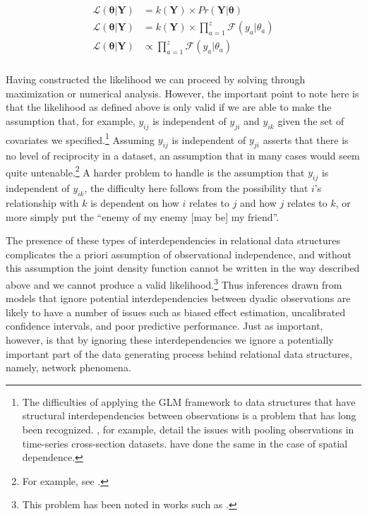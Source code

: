 \begin{align}
\begin{aligned}
	\mathcal{L} (\bm{\theta} | \mathbf{Y}) &= k(\mathbf{Y}) \times Pr(\mathbf{Y} | \bm{\theta}) \\
	\mathcal{L} (\bm{\theta} | \mathbf{Y}) &= k(\mathbf{Y}) \times \prod_{a=1}^{z} \mathcal{F}(y_{a} | \theta_{a}) \\	
	\mathcal{L} (\bm{\theta} | \mathbf{Y}) &\propto \prod_{a=1}^{z} \mathcal{F}(y_{a} | \theta_{a}) \\
\end{aligned}
\end{align}

Having constructed the likelihood we can proceed by solving through maximization or numerical analysis. However, the important point to note here is that the likelihood as defined above is only valid if we are able to make the assumption that, for example, $y_{ij}$ is independent of $y_{ji}$ and $y_{ik}$ given the set of covariates we specified.\footnote{The difficulties of applying the GLM framework to data structures that have structural interdependencies between observations is a problem that has long been recognized. \citet{beck:katz:1995}, for example, detail the issues with pooling observations in time-series cross-section datasets. \citet{ward:gleditsch:2008} have done the same in the case of spatial dependence.} Assuming $y_{ij}$ is independent of $y_{ji}$ asserts that there is no level of reciprocity in a dataset, an assumption that in many cases would seem quite untenable.\footnote{For example, see \citet{ward:etal:2007,cranmer:2014}.} A harder problem to handle is the assumption that $y_{ij}$ is independent of $y_{ik}$, the difficulty here follows from the possibility that $i$'s relationship with $k$ is dependent on how $i$ relates to $j$ and how $j$ relates to $k$, or more simply put the ``enemy of my enemy [may be] my friend''. 

The presence of these types of interdependencies in relational data structures complicates the a priori assumption of observational independence, and without this assumption the joint density function cannot be written in the way described above and we cannot produce a valid likelihood.\footnote{This problem has been noted in works such as \citet{lai:1995,manger:etal:2012,kinne:2013}.} Thus inferences drawn from models that ignore potential interdependencies between dyadic observations are likely to have a number of issues such as biased effect estimation, uncalibrated confidence intervals, and poor predictive performance. Just as important, however, is that by ignoring these interdependencies we ignore a potentially important part of the data generating process behind relational data structures, namely, network phenomena. 


